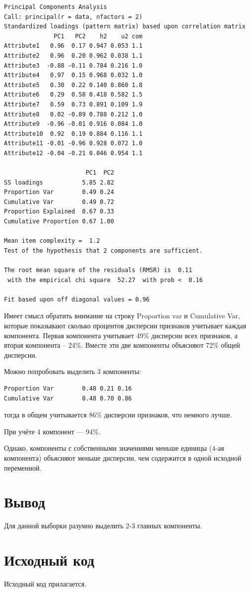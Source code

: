 \documentclass{article} %
\begin{document}
\begin{lstlisting}
Principal Components Analysis
Call: principal(r = data, nfactors = 2)
Standardized loadings (pattern matrix) based upon correlation matrix
              PC1   PC2    h2    u2 com
Attribute1   0.96  0.17 0.947 0.053 1.1
Attribute2   0.96  0.20 0.962 0.038 1.1
Attribute3  -0.88 -0.11 0.784 0.216 1.0
Attribute4   0.97  0.15 0.968 0.032 1.0
Attribute5   0.30  0.22 0.140 0.860 1.8
Attribute6   0.29  0.58 0.418 0.582 1.5
Attribute7   0.59  0.73 0.891 0.109 1.9
Attribute8   0.02 -0.89 0.788 0.212 1.0
Attribute9  -0.96 -0.01 0.916 0.084 1.0
Attribute10  0.92  0.19 0.884 0.116 1.1
Attribute11 -0.01 -0.96 0.928 0.072 1.0
Attribute12 -0.04 -0.21 0.046 0.954 1.1

                       PC1  PC2
SS loadings           5.85 2.82
Proportion Var        0.49 0.24
Cumulative Var        0.49 0.72
Proportion Explained  0.67 0.33
Cumulative Proportion 0.67 1.00

Mean item complexity =  1.2
Test of the hypothesis that 2 components are sufficient.

The root mean square of the residuals (RMSR) is  0.11 
 with the empirical chi square  52.27  with prob <  0.16 

Fit based upon off diagonal values = 0.96
\end{lstlisting}

Имеет смысл обратить внимание на строку Proportion var и Cumulative Var,
которые показывают сколько процентов дисперсии признаков
учитывает каждая компонента.
Первая компонента учитывает 49\% дисперсии всех признаков,
а вторая компонента – 24\%.
Вместе эти две компоненты объясняют 72\% общей дисперсии.

Можно попробовать выделить 3 компоненты:
\begin{lstlisting}
Proportion Var        0.48 0.21 0.16
Cumulative Var        0.48 0.70 0.86
\end{lstlisting}
тогда в общем учитывается 86\% дисперсии признаков,
что немного лучше.

При учёте 4 компонент --- 94\%.

Однако, компоненты с собственными значениями меньше единицы (4-ая компонента)
объясняют меньше дисперсии, чем содержится в одной исходной переменной.

\section*{Вывод}
Для данной выборки разумно выделить 2-3 главных компоненты.

\section*{Исходный код}
Исходный код прилагается.
\end{document}

